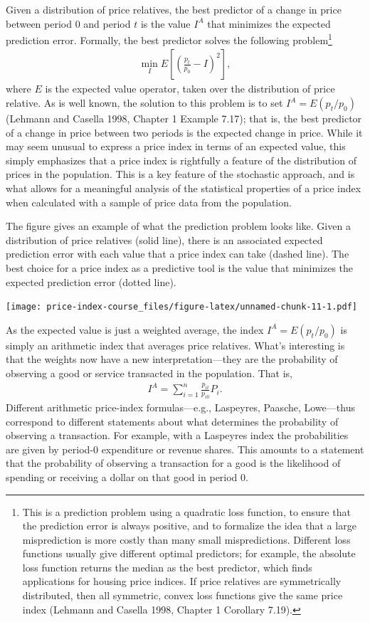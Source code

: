 \documentclass[
]{article}
\begin{document}
Given a distribution of price relatives, the best predictor of a change in price between period 0 and period \(t\) is the value \(I^{A}\) that minimizes the expected prediction error. Formally, the best predictor solves the following problem\footnote{This is a prediction problem using a quadratic loss function, to ensure that the prediction error is always positive, and to formalize the idea that a large misprediction is more costly than many small mispredictions. Different loss functions usually give different optimal predictors; for example, the absolute loss function returns the median as the best predictor, which finds applications for housing price indices. If price relatives are symmetrically distributed, then all symmetric, convex loss functions give the same price index (Lehmann and Casella 1998, Chapter 1 Corollary 7.19).}
\begin{align*}
\min_{I} E\left[\left(\frac{p_{t}}{p_{0}} - I \right)^{2}\right],
\end{align*}
where \(E\) is the expected value operator, taken over the distribution of price relative. As is well known, the solution to this problem is to set \(I^{A} = E(p_{t} / p_{0})\) (Lehmann and Casella 1998, Chapter 1 Example 7.17); that is, the best predictor of a change in price between two periods is the expected change in price. While it may seem unusual to express a price index in terms of an expected value, this simply emphasizes that a price index is rightfully a feature of the distribution of prices in the population. This is a key feature of the stochastic approach, and is what allows for a meaningful analysis of the statistical properties of a price index when calculated with a sample of price data from the population.

The figure gives an example of what the prediction problem looks like. Given a distribution of price relatives (solid line), there is an associated expected prediction error with each value that a price index can take (dashed line). The best choice for a price index as a predictive tool is the value that minimizes the expected prediction error (dotted line).

\texttt{[image: price-index-course\_files/figure-latex/unnamed-chunk-11-1.pdf]}

As the expected value is just a weighted average, the index \(I^{A} = E(p_{t} / p_{0})\) is simply an arithmetic index that averages price relatives. What's interesting is that the weights now have a new interpretation---they are the probability of observing a good or service transacted in the population. That is,
\begin{align*}
I^{A} = \sum_{i = 1}^{n} \frac{p_{it}}{p_{i0}} P_{i}.
\end{align*}
Different arithmetic price-index formulas---e.g., Laspeyres, Paasche, Lowe---thus correspond to different statements about what determines the probability of observing a transaction. For example, with a Laspeyres index the probabilities are given by period-0 expenditure or revenue shares. This amounts to a statement that the probability of observing a transaction for a good is the likelihood of spending or receiving a dollar on that good in period 0.
\end{document}

